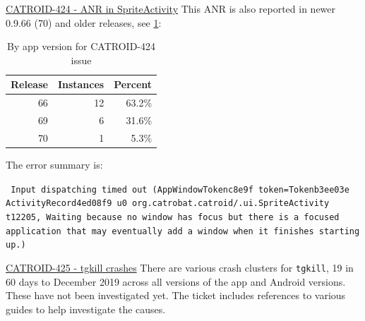 \href{https://jira.catrob.at/browse/CATROID-424}{CATROID-424 - ANR in SpriteActivity} This ANR is also reported in newer 0.9.66 (70) and older releases, see \ref{tab:catroid_424}:

\begin{table}[htbp!]
    \centering
    \begin{tabular}{r|r|r}
Release	&Instances	&Percent \\
\hline
66	&12	&63.2\% \\
69	&6	&31.6\% \\
70	&1	&5.3\% \\
    \end{tabular}
    \caption{By app version for CATROID-424 issue}
    \label{tab:catroid_424}
\end{table}

The error summary is:

\texttt{\footnotesize{
Input dispatching timed out (AppWindowToken{c8e9f token=Token{b3ee03e ActivityRecord{4ed08f9 u0 org.catrobat.catroid/.ui.SpriteActivity t12205}}}, Waiting because no window has focus but there is a focused application that may eventually add a window when it finishes starting up.)}}

\href{https://jira.catrob.at/browse/CATROID-425}{CATROID-425 - tgkill crashes} There are various crash clusters for \texttt{tgkill}, 19 in 60 days to  December 2019 across all versions of the app and Android versions. These have not been investigated yet. The ticket includes references to various guides to help investigate the causes.

